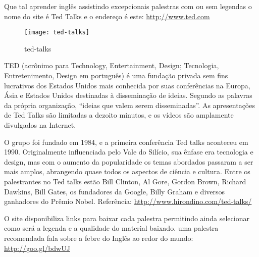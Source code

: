 Que tal aprender inglês assistindo excepcionais palestras com ou sem
legendas o nome do site é Ted Talks e o endereço é este:  \href{http://www.ted.com}{http://www.ted.com}

\begin{figure}[h!]
	\centering
	\texttt{[image: ted-talks]}
	\caption{ted-talks}
\end{figure}

TED (acrônimo para Technology, Entertainment, Design; Tecnologia,
Entretenimento, Design em português) é uma fundação privada sem fins
lucrativos dos Estados Unidos mais conhecida por suas conferências na
Europa, Ásia e Estados Unidos destinadas à disseminação de ideias.
Segundo as palavras da própria organização, “ideias que valem serem
disseminadas”.  As apresentações de Ted Talks são limitadas a dezoito
minutos, e os vídeos são amplamente divulgados na Internet.

O grupo foi fundado em 1984, e a primeira conferência Ted talks
aconteceu em 1990. Originalmente influenciada pelo Vale do Silício,
sua ênfase era tecnologia e design, mas com o aumento da popularidade
os temas abordados passaram a ser mais amplos, abrangendo quase todos
os aspectos de ciência e cultura. Entre os palestrantes no Ted talks
estão Bill Clinton, Al Gore, Gordon Brown, Richard Dawkins, Bill
Gates, os fundadores da Google, Billy Graham e diversos ganhadores do
Prêmio Nobel. Referência:
\href{http://www.hirondino.com/ted-talks/}{http://www.hirondino.com/ted-talks/}

O site disponibiliza links para baixar cada palestra permitindo ainda
selecionar como será a legenda e a qualidade do material baixado. uma
palestra recomendada fala sobre a febre do Inglês ao redor do mundo:
\href{http://goo.gl/bdwUJ}{http://goo.gl/bdwUJ}

